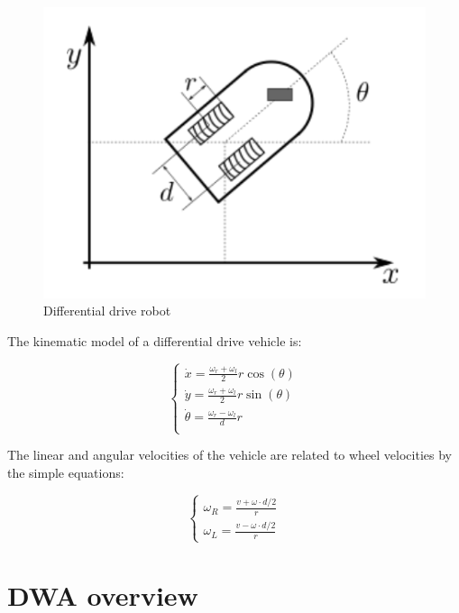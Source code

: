 \documentclass[11pt,a4paper]{article}
\begin{document}
\begin{figure}[H]
    \centering
    \includegraphics[scale=0.4]{other/differential_drive.png}
    \caption{Differential drive robot}
\end{figure}

The kinematic model of a differential drive vehicle is:

$$
\begin{cases}
    \dot{x} = \frac{\omega_r + \omega_l}{2} r \cos(\theta) \\
    \dot{y} = \frac{\omega_r + \omega_l}{2} r \sin(\theta) \\
    \dot{\theta} = \frac{\omega_r - \omega_l}{d} r \\
\end{cases}
$$

The linear and angular velocities of the vehicle are related to wheel velocities by the simple equations:

$$
\begin{cases}
    \omega_R = {\frac {v + \omega \cdot d/2}{r}} \\
    \omega_L = {\frac {v - \omega \cdot d/2}{r}}
\end{cases}
$$





\section{DWA overview}
\end{document}
